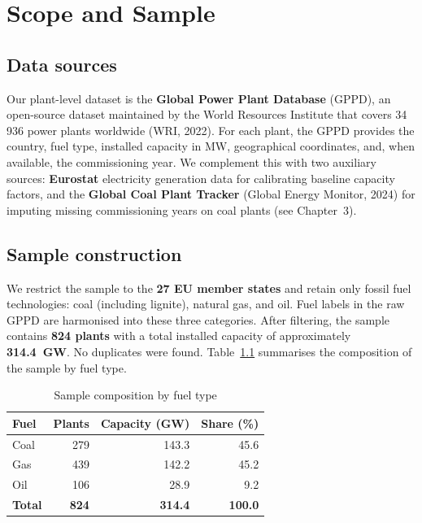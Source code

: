 \documentclass[a4paper, 12pt]{report}
\numberwithin{equation}{chapter}
\numberwithin{figure}{chapter}
\numberwithin{table}{chapter}
\begin{document}
\chapter{Scope and Sample}
\label{ch:scope}

\section{Data sources}

Our plant-level dataset is the \textbf{Global Power Plant Database} (GPPD), an open-source dataset maintained by the World Resources Institute that covers 34\,936 power plants worldwide (WRI, 2022). For each plant, the GPPD provides the country, fuel type, installed capacity in MW, geographical coordinates, and, when available, the commissioning year. We complement this with two auxiliary sources: \textbf{Eurostat} electricity generation data for calibrating baseline capacity factors, and the \textbf{Global Coal Plant Tracker} (Global Energy Monitor, 2024) for imputing missing commissioning years on coal plants (see Chapter~3).

\section{Sample construction}

We restrict the sample to the \textbf{27 EU member states} and retain only fossil fuel technologies: coal (including lignite), natural gas, and oil. Fuel labels in the raw GPPD are harmonised into these three categories. After filtering, the sample contains \textbf{824 plants} with a total installed capacity of approximately \textbf{314.4~GW}. No duplicates were found. Table~\ref{tab:sample} summarises the composition of the sample by fuel type.

\begin{table}[H]
\centering
\caption{Sample composition by fuel type}
\label{tab:sample}
\vspace{0.2cm}
\begin{tabular}{l r r r}
\toprule
\textbf{Fuel} & \textbf{Plants} & \textbf{Capacity (GW)} & \textbf{Share (\%)} \\
\midrule
Coal   & 279 & 143.3 & 45.6 \\
Gas    & 439 & 142.2 & 45.2 \\
Oil    & 106 &  28.9 &  9.2 \\
\midrule
\textbf{Total} & \textbf{824} & \textbf{314.4} & \textbf{100.0} \\
\bottomrule
\end{tabular}
\end{table}
\end{document}
